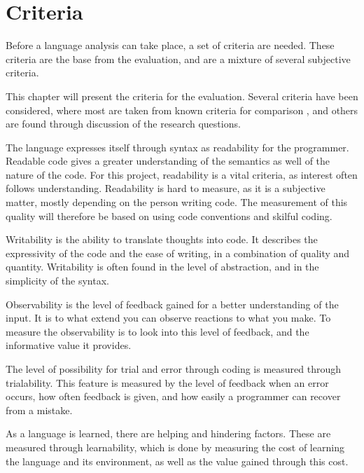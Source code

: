 \chapter{Criteria}
\label{chap:criteria}

Before a language analysis can take place, a set of criteria are needed. These criteria are the base from the evaluation, and are a mixture of several subjective criteria.

This chapter will present the criteria for the evaluation. Several criteria have been considered, where most are taken from known criteria for comparison \cite{design_criteria1} \cite{design_criteria2}, and others are found through discussion of the research questions.

\begin{description}[style=nextline]
\item[Readability] The language expresses itself through syntax as readability for the programmer. Readable code gives a greater understanding of the semantics as well of the nature of the code. For this project, readability is a vital criteria, as interest often follows understanding. Readability is hard to measure, as it is a subjective matter, mostly depending on the person writing code. The measurement of this quality will therefore be based on using code conventions and skilful coding.
\item[Writability] Writability is the ability to translate thoughts into code. It describes the expressivity of the code and the ease of writing, in a combination of quality and quantity. Writability is often found in the level of abstraction, and in the simplicity of the syntax.
\item[Observability] Observability is the level of feedback gained for a better understanding of the input. It is to what extend you can observe reactions to what you make. To measure the observability is to look into this level of feedback, and the informative value it provides.
\item[Trialability] The level of possibility for trial and error through coding is measured through trialability. This feature is measured by the level of feedback when an error occurs, how often feedback is given, and how easily a programmer can recover from a mistake.
\item[Learnability] As a language is learned, there are helping and hindering factors. These are measured through learnability, which is done by measuring the cost of learning the language and its environment, as well as the value gained through this cost.

\end{description}
